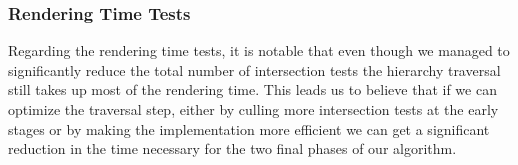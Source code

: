\subsubsection{Rendering Time Tests}

Regarding the rendering time tests, it is notable that even though we managed to significantly reduce the total number of intersection tests the hierarchy traversal still takes up most of the rendering time. This leads us to believe that if we can optimize the traversal step, either by culling more intersection tests at the early stages or by making the implementation more efficient we can get a significant reduction in the time necessary for the two final phases of our algorithm.